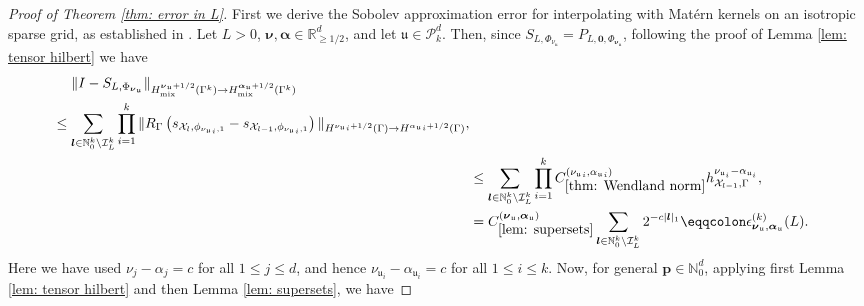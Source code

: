 \documentclass[pdflatex,sn-mathphys-num]{sn-jnl}%
\theoremstyle{thmstyleone}%
\theoremstyle{thmstyletwo}%
\theoremstyle{thmstylethree}%
\begin{document}
\begin{proof}[Proof of Theorem \ref{thm: error in L}]
    First we derive the Sobolev approximation error for interpolating with Mat\'ern kernels on an isotropic sparse grid, as established in \cite{Nobile2018}. Let \(L>0\), \(\boldsymbol{\nu},\boldsymbol{\alpha}\in\mathbb{R}^d_{\geq1/2}\), and let \(\mathfrak{u}\in\mathcal{P}_k^d\). Then, since \(S_{L,\Phi_{\nu_{\mathfrak{u}}}}=P_{L,\mathbf{0},\Phi_{\boldsymbol{\nu}_{\mathfrak{u}}}}\), following the proof of Lemma \ref{lem: tensor hilbert} we have
    \begin{align}
        \begin{split}
        &\quad\,\,\|I-S_{L,\Phi_{\boldsymbol{\nu}_{\mathfrak{u}}}}\|_{H_{\textrm{mix}}^{\boldsymbol{\nu}_{\mathfrak{u}}+1/2}(\Gamma^k)\rightarrow H_{\textrm{mix}}^{\boldsymbol{\alpha}_{\mathfrak{u}}+1/2}(\Gamma^k)} \\    &\leq\sum_{\boldsymbol{l}\in\mathbb{N}_0^k\setminus\mathcal{I}^k_L}\prod_{i=1}^k\|R_\Gamma\left(s_{\mathcal{X}_l,\phi_{{\nu_{\mathfrak{u}}}_i,1}}-s_{\mathcal{X}_{l-1},\phi_{{\nu_{\mathfrak{u}}}_i,1}}\right)\|_{H^{{\nu_{\mathfrak{u}}}_i+1/2}(\Gamma)\rightarrow H^{{\alpha_{\mathfrak{u}}}_i+1/2}(\Gamma)},
        \end{split}\nonumber\\
        &\leq\sum_{\boldsymbol{l}\in\mathbb{N}_0^k\setminus\mathcal{I}^k_L}\prod_{i=1}^kC^{({\nu_{\mathfrak{u}}}_i,{\alpha_{\mathfrak{u}}}_i)}_{\ref{thm: Wendland norm}}h_{\mathcal{X}_{l-1},\Gamma}^{\nu_{{\mathfrak{u}}_i}-\alpha_{{\mathfrak{u}}_i}},\nonumber\\
        &=C_{\ref{lem: supersets}}^{(\boldsymbol{\nu}_{\mathfrak{u}},\boldsymbol{\alpha}_{\mathfrak{u}})}\sum_{\boldsymbol{l}\in\mathbb{N}_0^k\setminus\mathcal{I}^k_L}2^{-c|\boldsymbol{l}|_1}\eqqcolon\epsilon^{(k)}_{\boldsymbol{\nu}_{\mathfrak{u}},\boldsymbol{\alpha}_{\mathfrak{u}}}(L).\nonumber
    \end{align}
    Here we have used \(\nu_j-\alpha_j=c\) for all \(1\leq j \leq d\), and hence \(\nu_{\mathfrak{u}_i}-\alpha_{\mathfrak{u}_i}=c\) for all \(1\leq i\leq k\).
    Now, for general \(\mathbf{p}\in\mathbb{N}_0^d\), applying first Lemma \ref{lem: tensor hilbert} and then Lemma \ref{lem: supersets}, we have


\end{proof}
\end{document}
